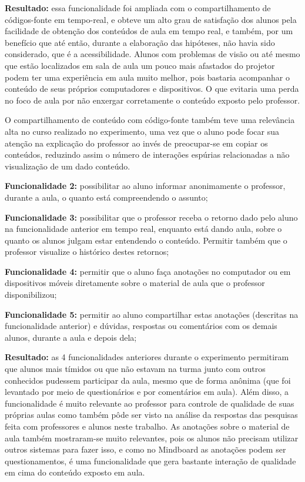 \textbf{Resultado:} essa funcionalidade foi ampliada com o compartilhamento de códigos-fonte em tempo-real, e obteve um alto grau de satisfação dos alunos pela facilidade de obtenção dos conteúdos de aula em tempo real, e também, por um benefício que até então, durante a elaboração das hipóteses, não havia sido considerado, que é a acessibilidade. Alunos com problemas de visão ou até mesmo que estão localizados em sala de aula um pouco mais afastados do projetor podem ter uma experiência em aula muito melhor, pois bastaria acompanhar o conteúdo de seus próprios computadores e dispositivos. O que evitaria uma perda no foco de aula por não enxergar corretamente o conteúdo exposto pelo professor. 

O compartilhamento de conteúdo com código-fonte também teve uma relevância alta no curso realizado no experimento, uma vez que o aluno pode focar sua atenção na explicação do professor ao invés de preocupar-se em copiar os conteúdos, reduzindo assim o número de interações espúrias relacionadas a não visualização de um dado conteúdo.

\textbf{Funcionalidade 2:} possibilitar ao aluno informar anonimamente o professor, durante a aula, o quanto está compreendendo o assunto;

\textbf{Funcionalidade 3:} possibilitar que o professor receba o retorno dado pelo aluno na funcionalidade anterior em tempo real, enquanto está dando aula, sobre o quanto os alunos julgam estar entendendo o conteúdo. Permitir também que o professor visualize o histórico destes retornos;

\textbf{Funcionalidade 4:} permitir que o aluno faça anotações no computador ou em dispositivos móveis diretamente sobre o material de aula que o professor disponibilizou;

\textbf{Funcionalidade 5:} permitir ao aluno compartilhar estas anotações (descritas na funcionalidade anterior) e dúvidas, respostas ou comentários com os demais alunos, durante a aula e depois dela;


\textbf{Resultado:} as 4 funcionalidades anteriores durante o experimento permitiram que alunos mais tímidos ou que não estavam na turma junto com outros conhecidos pudessem participar da aula, mesmo que de forma anônima (que foi levantado por meio de questionários e por comentários em aula). Além disso, a funcionalidade é muito relevante ao professor para controle de qualidade de suas próprias aulas como também pôde ser visto na análise da respostas das pesquisas feita com professores e alunos neste trabalho. 
As anotações sobre o material de aula também mostraram-se muito relevantes, pois os alunos não precisam utilizar outros sistemas para fazer isso, e como no Mindboard as anotações podem ser questionamentos, é uma funcionalidade que gera bastante interação de qualidade em cima do conteúdo exposto em aula.

